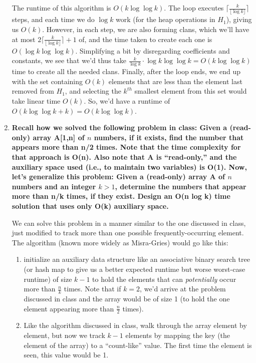 \documentclass[12pt]{article}
\begin{document}
\begin{enumerate}
    The runtime of this algorithm is $O(k\log\log k)$. The loop executes $\lceil \frac{k}{\lfloor \log k \rfloor} \rceil$ 
    steps, and each time we do $\log k$ work (for the heap operations in $H_1$), giving us $O(k)$. However, in each step, 
    we are also forming clans, which we'll have at most $2\lceil \frac{k}{\lfloor \log k \rfloor} \rceil + 1$ of, and 
    the time taken to create each one is $O(\log k \log\log k)$. Simplifying a bit by disregarding coefficients and 
    constants, we see that we'd thus take $\frac{k}{\log k} \cdot \log k \log\log k = O(k \log\log k)$ time to create 
    all the needed clans. Finally, after the loop ends, we end up with the set containing $O(k)$ elements that are less 
    than the element last removed from $H_1$, and selecting the $k^{th}$ smallest element from this set would take 
    linear time $O(k)$. So, we'd have a runtime of $O(k \log\log k + k) = O(k \log\log k)$.

    \item \textbf{Recall how we solved the following problem in class: Given a (read-only) 
    array A[1,n] of $n$ numbers, if it exists, find the number that appears more than n/2 
    times. Note that the time complexity for that approach is O(n). Also 
    note that A is ``read-only,'' and the auxiliary space used (i.e., to maintain two variables) 
    is O(1). Now, let's generalize this problem: Given a (read-only) array A of $n$ numbers and 
    an integer $k > 1$, determine the numbers that appear more than n/k times, if they exist. 
    Design an O(n log k) time solution that uses only O(k) auxiliary space.}

    We can solve this problem in a manner similar to the one discussed in class, just modified to 
    track more than one possible frequently-occurring element. The algorithm (known more widely as Misra-Gries) would go 
    like this:

    \begin{enumerate}
        \item initialize an auxiliary data structure like an associative binary search tree (or hash map to give us 
        a better expected runtime but worse worst-case runtime) of size $k - 1$ to hold the elements that can 
        \textit{potentially} occur more than $\frac{n}{k}$ times. Note that if $k = 2$, we'd 
        arrive at the problem discussed in class and the array would be of size 1 (to hold the 
        one element appearing more than $\frac{n}{2}$ times).
        
        \item Like the algorithm discussed in class, walk through the array element by element, 
        but now we track $k - 1$ elements by mapping the key (the element of the array) to a ``count-like'' value. 
        The first time the element is seen, this value would be 1.
        

\end{enumerate}
\end{enumerate}
\end{document}
